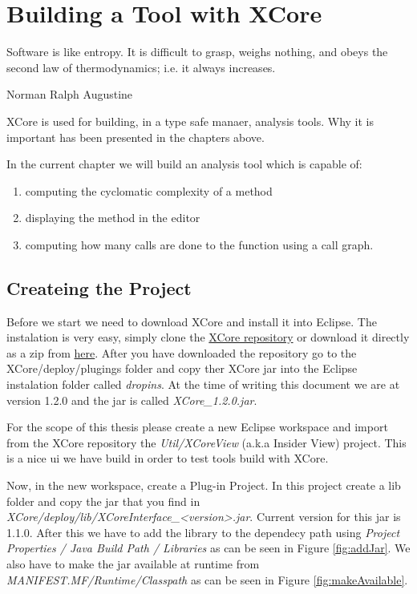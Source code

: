 \chapter{Building a Tool with XCore}

\epigraph{Software is like entropy. It is difficult to grasp, weighs nothing, and obeys the second law of thermodynamics; i.e. it always increases.}{Norman Ralph Augustine}

XCore is used for building, in a type safe manaer, analysis tools. Why it is important has been presented in the chapters above. 

In the current chapter we will build an analysis tool which is capable of:
        \begin{enumerate}
                \item computing the cyclomatic complexity of a method
                \item displaying the method in the editor
                \item computing how many calls are done to the function using a call graph.
        \end{enumerate}

\section{Createing the Project}

        Before we start we need to download XCore and install it into Eclipse. The instalation is very easy, simply clone the \href{https://github.com/SAlexandru/XCore}{XCore repository}
or download it directly as a zip from \href{https://github.com/SAlexandru/XCore/archive/master.zip}{here}. After you have downloaded the repository go to the XCore/deploy/plugings folder
and copy ther XCore jar into the Eclipse instalation folder called \textit{dropins}. At the time of writing this document we are at version 1.2.0 and the jar is called \textit{XCore\_1.2.0.jar}. 

        For the scope of this thesis please create a new Eclipse workspace and import from the XCore repository the \textit{Util/XCoreView} (a.k.a Insider View) project. This is a nice ui we have
build in order to test tools build with XCore.

        Now, in the new workspace, create a Plug-in Project. In this project create a lib folder and copy the jar that you find in \textit{XCore/deploy/lib/XCoreInterface\_<version>.jar}. Current version 
for this jar is 1.1.0. After this we have to add the library to the dependecy path using \textit{Project Properties / Java Build Path / Libraries} as can be seen in Figure \ref{fig:addJar}. We
also have to make the jar available at runtime from \textit{MANIFEST.MF/Runtime/Classpath} as can be seen in Figure \ref{fig:makeAvailable}. 

